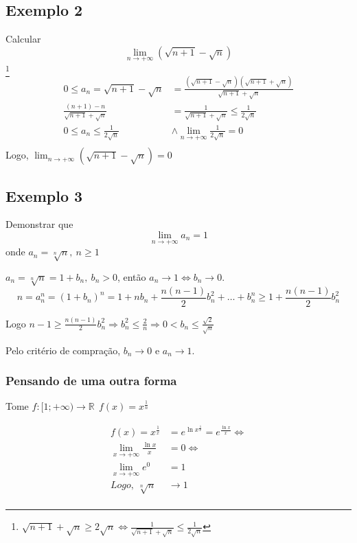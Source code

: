 \documentclass[12pt,openany]{book}
\begin{document}
\subsection*{Exemplo 2}
\label{subsec:ex222}
\hspace{5mm}Calcular $$\lim_{n \rightarrow +\infty} (\sqrt{n+1} - \sqrt{n})$$
\footnote{$\sqrt{n+1} + \sqrt{n} \geq 2\sqrt{n} \Longleftrightarrow \frac{1}{\sqrt{n+1} + \sqrt{n}} \leq \frac{1}{2\sqrt{n}} $}
\begin{align*}
0 \leq a_n = \sqrt{n+1} - \sqrt{n} &= \frac{(\sqrt{n+1} - \sqrt{n})(\sqrt{n+1} + \sqrt{n})}{\sqrt{n+1} + \sqrt{n}} \\
\frac{(n+1) - n}{\sqrt{n+1} + \sqrt{n}} &= \frac{1}{\sqrt{n+1} + \sqrt{n}} \leq \frac{1}{2\sqrt{n}}\\
0 \leq a_n \leq \frac{1}{2\sqrt{n}} & \land \lim_{n \rightarrow +\infty}\frac{1}{2\sqrt{n}} = 0  \\
\end{align*}
\hspace{5mm} Logo, $\displaystyle{\lim_{n \rightarrow +\infty} (\sqrt{n+1} - \sqrt{n}) = 0}$

\subsection*{Exemplo 3}
\label{subsec:ex223}
\hspace{5mm}Demonstrar que $$\lim_{n \rightarrow +\infty} a_n = 1$$ onde $a_n = \sqrt[n]{n},\ n \geq 1$

$a_n = \sqrt[n]{n} = 1 + b_n, \ b_n > 0$, então $a_n \rightarrow 1 \Longleftrightarrow b_n \rightarrow 0$.
$$n = a_n^n =(1+ b_n)^n = 1 + nb_n + \frac{n(n-1)}{2}b_n^2 + \hdots + b_n^n \geq 1 + \frac{n(n-1)}{2}b_n^2$$

Logo $\displaystyle{n-1 \geq \frac{n(n-1)}{2}b_n^2 \Rightarrow b_n^2 \leq \frac{2}{n} \Rightarrow 0 < b_n \leq \frac{\sqrt{2}}{\sqrt{n}}}$

Pelo critério de compração, $b_n \rightarrow 0$ e $a_n \rightarrow 1$.

\subsubsection{Pensando de uma outra forma} Tome $f: [1;+\infty) \rightarrow \mathds{R} \ \ f(x) = x^{\frac{1}{n}}$

\begin{align*}
f(x) = x^{\frac{1}{x}} &= e^{\ln x^{\frac{1}{x}}} =   e^{\frac{\ln x}{x}} \Longleftrightarrow \\
\lim_{x \rightarrow +\infty} \frac{\ln x}{x} &= 0 \Longleftrightarrow \\
\lim_{x \rightarrow +\infty} e^0 &= 1 \\
Logo, \ \sqrt[n]{n} & \rightarrow 1 \\
\end{align*}
\end{document}
